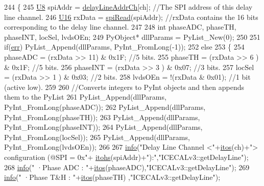 \begin{DoxyCode}
244 \{                            
245     \hyperlink{ICECALv3_8h_a3cb25ca6f51f003950f9625ff05536fc}{U8} spiAddr = \hyperlink{ICECALv3_8h_a848408b773702d268053cb49d205e097}{delayLineAddrCh}[ch];          \textcolor{comment}{//The SPI address of this delay line
       channel.}
246     \hyperlink{ICECALv3_8h_adf928e51a60dba0df29d615401cc55a8}{U16} rxData = \hyperlink{classICECALv3_aaabb9543482c4141fa89b4b8410164e0}{spiRead}(spiAddr);                \textcolor{comment}{//rxData contains the 16 bits corresponding to
       the delay line channel.}
247 
248     \textcolor{keywordtype}{int} phaseADC, phaseTH, phaseINT, locSel, lvdsOEn;
249     PyObject* dllParams = PyList\_New(0);
250 
251     \textcolor{keywordflow}{if}(\hyperlink{classICECALv3_ad8989925ee5b3ff322d863ce6aaff0bd}{err}) PyList\_Append(dllParams, PyInt\_FromLong(-1));
252     \textcolor{keywordflow}{else}
253     \{
254         phaseADC = (rxData >> 11) & 0x1F;       \textcolor{comment}{//5 bits.}
255         phaseTH  = (rxData >> 6 ) & 0x1F;       \textcolor{comment}{//5 bits.}
256         phaseINT = (rxData >> 3 ) & 0x07;       \textcolor{comment}{//3 bits.}
257         locSel   = (rxData >> 1 ) & 0x03;       \textcolor{comment}{//2 bits.}
258         lvdsOEn  = !(rxData & 0x01);                \textcolor{comment}{//1 bit (active low).}
259 
260         \textcolor{comment}{//Converts integers to PyInt objects and then appends them to the PyList}
261         PyList\_Append(dllParams, PyInt\_FromLong(phaseADC));
262         PyList\_Append(dllParams, PyInt\_FromLong(phaseTH));
263         PyList\_Append(dllParams, PyInt\_FromLong(phaseINT));
264         PyList\_Append(dllParams, PyInt\_FromLong(locSel));
265         PyList\_Append(dllParams, PyInt\_FromLong(lvdsOEn));
266 
267         \hyperlink{classObject_a644fd329ea4cb85f54fa6846484b84a8}{info}(\textcolor{stringliteral}{"Delay Line Channel <"}+\hyperlink{Tools_8h_af330027dbdafb9a30768b3613c553e60}{itos}(ch)+\textcolor{stringliteral}{"> configuration (@SPI = 0x"}+
      \hyperlink{classICECALv3_a04b02e583f191bfce34d05132cd23834}{itohs}(spiAddr)+\textcolor{stringliteral}{"):"},\textcolor{stringliteral}{"ICECALv3::getDelayLine"});
268         \hyperlink{classObject_a644fd329ea4cb85f54fa6846484b84a8}{info}(\textcolor{stringliteral}{"   ·Phase ADC          : "}+\hyperlink{Tools_8h_af330027dbdafb9a30768b3613c553e60}{itos}(phaseADC),\textcolor{stringliteral}{"ICECALv3::getDelayLine"});
269         \hyperlink{classObject_a644fd329ea4cb85f54fa6846484b84a8}{info}(\textcolor{stringliteral}{"   ·Phase T&H          : "}+\hyperlink{Tools_8h_af330027dbdafb9a30768b3613c553e60}{itos}(phaseTH) ,\textcolor{stringliteral}{"ICECALv3::getDelayLine"});

\end{DoxyCode}
